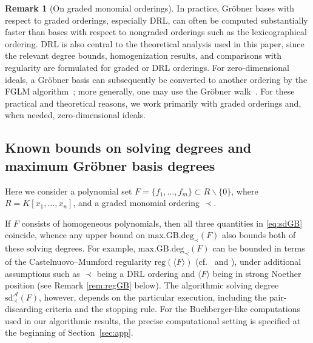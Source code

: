 \documentclass{article}
\theoremstyle{definition}
\newtheorem{remark}[theorem]{Remark}
\theoremstyle{plain}
\theoremstyle{plain}
\theoremstyle{plain}
\theoremstyle{plain}
\numberwithin{equation}{subsection}
\begin{document}
\begin{remark}[On graded monomial orderings]
In practice, Gr\"obner bases with respect to graded orderings, especially DRL, can often be computed substantially faster than bases with respect to nongraded orderings such as the lexicographical ordering.
DRL is also central to the theoretical analysis used in this paper, since the relevant degree bounds, homogenization results, and comparisons with regularity are formulated for graded or DRL orderings.
For zero-dimensional ideals, a Gr\"obner basis can subsequently be converted to another ordering by the FGLM algorithm~\cite{FGLM}; more generally, one may use the Gr\"obner walk~\cite{GroebnerWalk}.
For these practical and theoretical reasons, we work primarily with graded orderings and, when needed, zero-dimensional ideals.
\end{remark}

\subsection{Known bounds on solving degrees and maximum Gr\"obner basis degrees}\label{subsec:knownbound}

Here we consider a polynomial set $F=\{f_1,\ldots,f_m\}\subset R\smallsetminus\{0\}$,
where $R=K[x_1,\ldots,x_n]$, and a graded monomial ordering $\prec$.

If $F$ consists of homogeneous polynomials, then all three quantities in \eqref{eq:sdGB} coincide, whence any upper bound on $\mathrm{max.GB.deg}_{\prec}(F)$ also bounds both of these solving degrees.
For example, $\mathrm{max.GB.deg}_{\prec}(F)$ can be bounded in terms of the Castelnuovo--Mumford regularity $\mathrm{reg}(\langle F \rangle)$ (cf.\ \cite[Corollary 2.5]{BS} and \cite[Proposition 4.15]{Hashemi2010}), under additional assumptions such as $\prec$ being a DRL ordering and $\langle F \rangle$ being in strong Noether position (see Remark \ref{rem:regGB} below).
The algorithmic solving degree $\mathrm{sd}_{\prec}^{\mathcal A}(F)$, however, depends on the particular execution, including the pair-discarding criteria and the stopping rule.
For the Buchberger-like computations used in our algorithmic results, the precise computational setting is specified at the beginning of Section~\ref{sec:app}.
\end{document}
